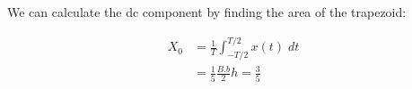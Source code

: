 \begin{enumerate}
We can calculate the dc component by finding the area of the trapezoid:

\begin{equation*}
\begin{aligned}
X_0 &= \frac{1}{T} \displaystyle\int_{- T/2}^{T/2} x(t) \;dt \\
    &= \frac{1}{5}  \frac{B.b}{2} h = \frac{3}{5}
\end{aligned}
\end{equation*} 

\end{enumerate} 



